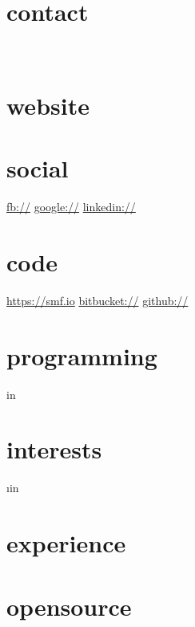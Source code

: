 \documentclass[]{fancy-cv}
\begin{document}
\header{\MakeLowercase\myfirstname}{\MakeLowercase\mylastname}{\MakeLowercase\mytitle}

\begin{aside}
  \section{contact}
    \href{mailto:\myemail}{\myemail}
    ~
    \myphone
    ~
    \myaddress%
    \mycity
  \section{website}
    \href{\mywebsite}{\mywebsite}
  \section{social}
    \href{http://facebook.com/\myfb}{fb://\myfb}
    \href{http://plug.google.com/\mygp}{google://\mygp}
    \href{http://www.linkedin.com/in/\mylinkedin}{linkedin://\mylinkedin}
  \section{code}
    \href{https://smf.io}{https://smf.io}
    \href{https://bitbucket.org/\myfb}{bitbucket://\myfb}
    \href{https://github.com/\myfb}{github://\myfb}
  \section{programming}
     \lang in \programming {%
      \lang
    }%
  \section{interests}
     \i in \interests {%
      \MakeLowercase\i
    }%
\end{aside}

\section{experience}
\label{sec:experience}


\vspace{-1.75em}
\section{opensource}
\end{document}
